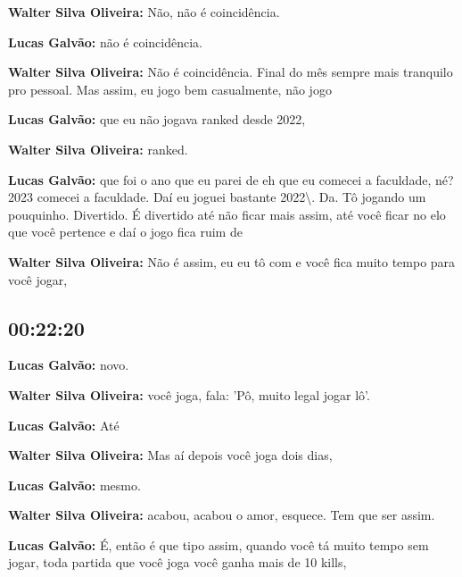 \textbf{Walter Silva Oliveira:} Não, não é coincidência.



\textbf{Lucas Galvão:} não é coincidência.



\textbf{Walter Silva Oliveira:} Não é coincidência. Final do mês sempre mais tranquilo pro pessoal. Mas assim, eu jogo bem casualmente, não jogo



\textbf{Lucas Galvão:} que eu não jogava ranked desde 2022,



\textbf{Walter Silva Oliveira:} ranked.



\textbf{Lucas Galvão:} que foi o ano que eu parei de eh que eu comecei a faculdade, né? 2023 comecei a faculdade. Daí eu joguei bastante 2022\textbackslash{}. Da. Tô jogando um pouquinho. Divertido. É divertido até não ficar mais assim, até você ficar no elo que você pertence e daí o jogo fica ruim de



\textbf{Walter Silva Oliveira:} Não é assim, eu eu tô com e você fica muito tempo para você jogar,



\subsection{\textbf{00:22:20}}



\textbf{Lucas Galvão:} novo.



\textbf{Walter Silva Oliveira:} você joga, fala: 'Pô, muito legal jogar lô'.



\textbf{Lucas Galvão:} Até



\textbf{Walter Silva Oliveira:} Mas aí depois você joga dois dias,



\textbf{Lucas Galvão:} mesmo.



\textbf{Walter Silva Oliveira:} acabou, acabou o amor, esquece. Tem que ser assim.



\textbf{Lucas Galvão:} É, então é que tipo assim, quando você tá muito tempo sem jogar, toda partida que você joga você ganha mais de 10 kills,



